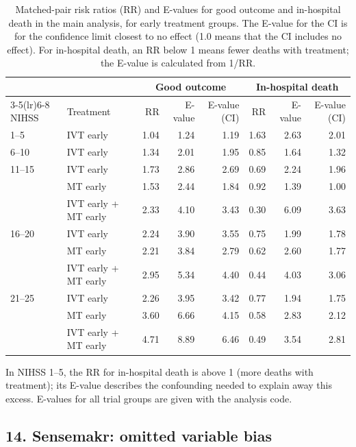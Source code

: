 \begin{table}[H]
\centering
\small
\caption{Matched-pair risk ratios (RR) and E-values for good outcome and in-hospital death in the main analysis, for early treatment groups. The E-value for the CI is for the confidence limit closest to no effect (1.0 means that the CI includes no effect). For in-hospital death, an RR below 1 means fewer deaths with treatment; the E-value is calculated from 1/RR.}
\label{tab:supp_evalues}
\begin{tabular}{llrrrrrr}
\toprule
 & & \multicolumn{3}{c}{Good outcome} & \multicolumn{3}{c}{In-hospital death} \\
\cmidrule(lr){3-5}\cmidrule(lr){6-8}
NIHSS & Treatment & RR & E-value & E-value (CI) & RR & E-value & E-value (CI) \\
\midrule
1--5 & IVT early & 1.04 & 1.24 & 1.19 & 1.63 & 2.63 & 2.01 \\
6--10 & IVT early & 1.34 & 2.01 & 1.95 & 0.85 & 1.64 & 1.32 \\
11--15 & IVT early & 1.73 & 2.86 & 2.69 & 0.69 & 2.24 & 1.96 \\
 & MT early & 1.53 & 2.44 & 1.84 & 0.92 & 1.39 & 1.00 \\
 & IVT early + MT early & 2.33 & 4.10 & 3.43 & 0.30 & 6.09 & 3.63 \\
16--20 & IVT early & 2.24 & 3.90 & 3.55 & 0.75 & 1.99 & 1.78 \\
 & MT early & 2.21 & 3.84 & 2.79 & 0.62 & 2.60 & 1.77 \\
 & IVT early + MT early & 2.95 & 5.34 & 4.40 & 0.44 & 4.03 & 3.06 \\
21--25 & IVT early & 2.26 & 3.95 & 3.42 & 0.77 & 1.94 & 1.75 \\
 & MT early & 3.60 & 6.66 & 4.15 & 0.58 & 2.83 & 2.12 \\
 & IVT early + MT early & 4.71 & 8.89 & 6.46 & 0.49 & 3.54 & 2.81 \\
\bottomrule
\end{tabular}
\end{table}

{\footnotesize In NIHSS 1--5, the RR for in-hospital death is above 1 (more deaths with treatment); its E-value describes the confounding needed to explain away this excess. E-values for all trial groups are given with the analysis code.}

\subsection*{14. Sensemakr: omitted variable bias}

